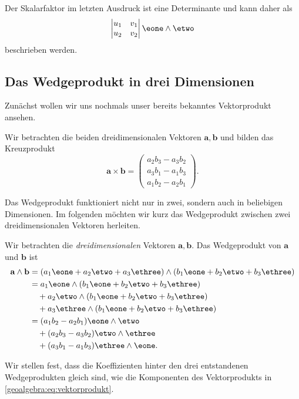 Der Skalarfaktor im letzten Ausdruck ist eine Determinante und kann daher als
\begin{equation}
  \begin{vmatrix}
    u_1 & v_1 \\
    u_2 & v_2
  \end{vmatrix}
  \eone \wedge \etwo
\end{equation}
beschrieben werden.

\subsection{Das Wedgeprodukt in drei Dimensionen}
Zunächst wollen wir uns nochmals unser bereits bekanntes
Vektorprodukt ansehen.
\begin{definition}
  Wir betrachten die beiden dreidimensionalen Vektoren $\mathbf{a}, \mathbf{b}$
  und bilden das Kreuzprodukt
  \begin{equation}
    \mathbf{a} \times \mathbf{b} = \begin{pmatrix} a_2 b_3 - a_3 b_2 \\ a_3 b_1 - a_1 b_3 \\ a_1 b_2 - a_2 b_1 \end{pmatrix}.
    \label{geoalgebra:eq:vektorprodukt}
  \end{equation}
  
\end{definition}

Das Wedgeprodukt funktioniert nicht nur in zwei, sondern auch
in beliebigen Dimensionen. Im folgenden möchten wir kurz
das Wedgeprodukt zwischen zwei dreidimensionalen Vektoren
herleiten.

\begin{definition}
Wir betrachten die \emph{dreidimensionalen} Vektoren $\mathbf{a}, \mathbf{b}$.
Das Wedgeprodukt von $\mathbf{a}$ und $\mathbf{b}$ ist
\begin{equation}
  \begin{aligned}
      \mathbf{a} \wedge \mathbf{b} &= (a_1 \eone + a_2 \etwo + a_3 \ethree) \wedge (b_1 \eone + b_2 \etwo + b_3 \ethree) \\
      &= a_1 \eone \wedge (b_1 \eone + b_2 \etwo + b_3 \ethree) \\
      &\quad+ a_2 \etwo \wedge (b_1 \eone + b_2 \etwo + b_3 \ethree) \\
      &\quad+ a_3 \ethree \wedge (b_1 \eone + b_2 \etwo + b_3 \ethree) \\
      &= (a_1 b_2 - a_2 b_1) \eone \wedge \etwo \\
      &\quad+ (a_2 b_3 - a_3 b_2) \etwo \wedge \ethree \\
      &\quad+ (a_3 b_1 - a_1 b_3) \ethree \wedge \eone.
  \end{aligned}
\end{equation}
\label{geoalgebra:eq:wedgeprodukt-dreidimensional} \end{definition}
Wir stellen fest, dass die Koeffizienten hinter den drei entstandenen Wedgeprodukten
gleich sind, wie die Komponenten des Vektorprodukts in \eqref{geoalgebra:eq:vektorprodukt}.

